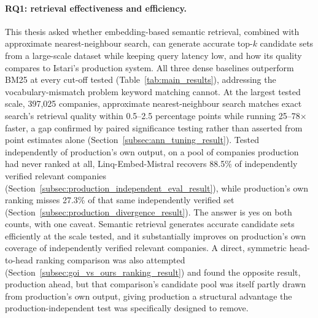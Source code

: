 \documentclass[a4paper,oneside,bibliography=totoc]{scrbook}
\begin{document}
\paragraph{RQ1: retrieval effectiveness and efficiency.} This thesis asked whether embedding-based semantic retrieval, combined with approximate nearest-neighbour search, can generate accurate top-$k$ candidate sets from a large-scale dataset while keeping query latency low, and how its quality compares to Istari's production system. All three dense baselines outperform BM25 at every cut-off tested (Table~\ref{tab:main_results}), addressing the vocabulary-mismatch problem keyword matching cannot. At the largest tested scale, 397,025 companies, approximate nearest-neighbour search matches exact search's retrieval quality within 0.5--2.5 percentage points while running 25--78$\times$ faster, a gap confirmed by paired significance testing rather than asserted from point estimates alone (Section~\ref{subsec:ann_tuning_result}). Tested independently of production's own output, on a pool of companies production had never ranked at all, Linq-Embed-Mistral recovers 88.5\% of independently verified relevant companies (Section~\ref{subsec:production_independent_eval_result}), while production's own ranking misses 27.3\% of that same independently verified set (Section~\ref{subsec:production_divergence_result}). The answer is yes on both counts, with one caveat. Semantic retrieval generates accurate candidate sets efficiently at the scale tested, and it substantially improves on production's own coverage of independently verified relevant companies. A direct, symmetric head-to-head ranking comparison was also attempted (Section~\ref{subsec:goi_vs_ours_ranking_result}) and found the opposite result, production ahead, but that comparison's candidate pool was itself partly drawn from production's own output, giving production a structural advantage the production-independent test was specifically designed to remove.
\end{document}
